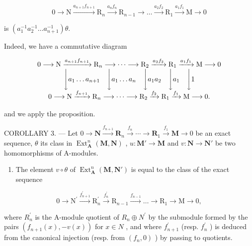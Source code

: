 \[
0 \rightarrow \mathrm{N} \xrightarrow {a _ {n + 1} f _ {n + 1}} \mathrm{R} _ {n} \xrightarrow {a _ {n} f _ {n}} \mathrm{R} _ {n - 1} \rightarrow \dots \xrightarrow {a _ {2} f _ {2}} \mathrm{R} _ {1} \xrightarrow {a _ {1} f _ {1}} \mathrm{M} \rightarrow 0
\]

is \((a_{1}^{-1}a_{2}^{-1}\dots a_{n + 1}^{-1})\theta .\)

Indeed, we have a commutative diagram

\[
\begin{array}{c} 0 \longrightarrow \mathrm{N} \xrightarrow {a _ {n + 1} f _ {n + 1}} \mathrm{R} _ {n} \longrightarrow \dots \longrightarrow \mathrm{R} _ {2} \xrightarrow {a _ {2} f _ {2}} \mathrm{R} _ {1} \xrightarrow {a _ {1} f _ {1}} \mathrm{M} \longrightarrow 0 \\ \Biggl \downarrow a _ {1} \dots a _ {n + 1} \quad \Biggl \downarrow a _ {1} \dots a _ {n} \quad \Biggl \downarrow a _ {1} a _ {2} \quad \Biggl \downarrow a _ {1} \quad \Biggl \downarrow 1 \\ 0 \longrightarrow \mathrm{N} \xrightarrow {f _ {n + 1}} \mathrm{R} _ {n} \longrightarrow \dots \longrightarrow \mathrm{R} _ {2} \xrightarrow {f _ {2}} \mathrm{R} _ {1} \xrightarrow {f _ {1}} \mathrm{M} \longrightarrow 0. \end{array}
\]

and we apply the proposition.

COROLLARY 3. --- Let \(0 \to \mathbf{N} \xrightarrow{f_{n+1}} \mathbf{R}_{n} \xrightarrow{f_{n}} \cdots \to \mathbf{R}_{1} \xrightarrow{f_{1}} \mathbf{M} \to 0\) be an exact sequence, \(\theta\) its class in \(\operatorname{Ext}_{\mathbf{A}}^{n}(\mathbf{M}, \mathbf{N})\) , \(u: \mathbf{M}' \to \mathbf{M}\) and \(v: \mathbf{N} \to \mathbf{N}'\) be two homomorphisms of A-modules.

\begin{enumerate}
\def\labelenumi{\alph{enumi})}
\tightlist
\item
  The element \(v \circ \theta\) of \(\operatorname{Ext}_{\mathbf{A}}^{n}(\mathbf{M}, \mathbf{N}')\) is equal to the class of the exact sequence
\end{enumerate}

\[
0 \rightarrow \mathrm{N} ^ {\prime} \xrightarrow {f _ {n + 1} ^ {\prime}} \mathrm{R} _ {n} ^ {\prime} \xrightarrow {f _ {n} ^ {\prime}} \mathrm{R} _ {n - 1} \xrightarrow {f _ {n - 1}} \dots \rightarrow \mathrm{R} _ {1} \rightarrow \mathrm{M} \rightarrow 0,
\]

where \(R_{n}^{\prime}\) is the A-module quotient of \(R_{n} \oplus N^{\prime}\) by the submodule formed by the pairs \((f_{n+1}(x), -v(x))\) for \(x \in N\) , and where \(f_{n+1}^{\prime}\) (resp. \(f_{n}^{\prime}\) ) is deduced from the canonical injection (resp. from \((f_{n}, 0)\) ) by passing to quotients.

